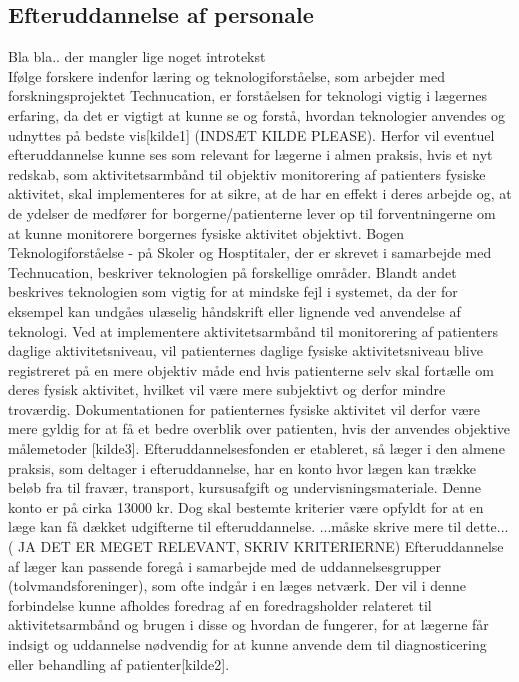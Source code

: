  
\subsection{Efteruddannelse af personale}
Bla bla.. der mangler lige noget introtekst\\

Ifølge forskere indenfor læring og teknologiforståelse, som arbejder med forskningsprojektet Technucation, er forståelsen for teknologi vigtig i lægernes erfaring, da det er vigtigt at kunne se og forstå, hvordan teknologier anvendes og udnyttes på bedste vis[kilde1] (INDSÆT KILDE PLEASE). Herfor vil eventuel efteruddannelse kunne ses som relevant for lægerne i almen praksis, hvis et nyt redskab, som aktivitetsarmbånd til objektiv monitorering af patienters fysiske aktivitet, skal implementeres for at sikre, at de har en effekt i deres arbejde og, at de ydelser de medfører for borgerne/patienterne lever op til forventningerne om at kunne monitorere borgernes fysiske aktivitet objektivt. Bogen Teknologiforståelse - på Skoler og Hosptitaler, der er skrevet i samarbejde med Technucation, beskriver teknologien på forskellige områder. Blandt andet beskrives teknologien som vigtig for at mindske fejl i systemet, da der for eksempel kan undgåes ulæselig håndskrift eller lignende ved anvendelse af teknologi. Ved at implementere aktivitetsarmbånd til monitorering af patienters daglige aktivitetsniveau, vil patienternes daglige fysiske aktivitetsniveau blive registreret på en mere objektiv måde end hvis patienterne selv skal fortælle om deres fysisk aktivitet, hvilket vil være mere subjektivt og derfor mindre troværdig. Dokumentationen for patienternes fysiske aktivitet vil derfor være mere gyldig for at få et bedre overblik over patienten, hvis der anvendes objektive målemetoder [kilde3]. 
Efteruddannelsesfonden er etableret, så læger i den almene praksis, som deltager i efteruddannelse, har en konto hvor lægen kan trække beløb fra til fravær, transport, kursusafgift og undervisningsmateriale. Denne konto er på cirka 13000 kr. Dog skal bestemte kriterier være opfyldt for at en læge kan få dækket udgifterne til efteruddannelse. ...måske skrive  mere til dette... ( JA DET ER MEGET RELEVANT, SKRIV KRITERIERNE) Efteruddannelse af læger kan passende foregå i samarbejde med de uddannelsesgrupper (tolvmandsforeninger), som ofte indgår i en læges netværk. Der vil i denne forbindelse kunne afholdes foredrag af en foredragsholder relateret til aktivitetsarmbånd og brugen i disse og hvordan de fungerer, for at lægerne får indsigt og uddannelse nødvendig for at kunne anvende dem til diagnosticering eller behandling af patienter[kilde2]. 
\\

